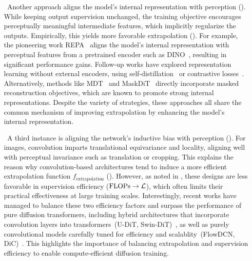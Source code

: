 {\textbf{}~Another approach aligns the model’s internal representation with perception (). While keeping output supervision unchanged, the training objective encourages perceptually meaningful intermediate features, which implicitly regularize the outputs. Empirically, this yields more favorable extrapolation (). For example, the pioneering work REPA~\citep{yu2024representation} aligns the model's internal representation with perceptual features from a pretrained encoder such as DINO~\citep{oquab2023dinov2}, resulting in significant performance gains. Follow-up works have explored representation learning without external encoders, using self-distillation~\citep{jiang2025no} or contrastive losses~\citep{wang2025diffuse}. Alternatively, methods like MDT~\citep{gao2023masked} and MaskDiT~\citep{zheng2023fast} directly incorporate masked reconstruction objectives, which are known to promote strong internal representations. Despite the variety of strategies, these approaches all share the common mechanism of improving extrapolation by enhancing the model’s internal representation.

\textbf{}~A third instance is aligning the network's inductive bias with perception (). For images, convolution imparts translational equivariance and locality, aligning well with perceptual invariance such as translation or cropping. This explains the reason why convolution-based architectures tend to induce a more efficient extrapolation function $f_{\text{extrapolation}}$ (). However, as noted in , these designs are less favorable in supervision efficiency ($\text{FLOPs} \to \mathcal{L}$), which often limits their practical effectiveness at large training scales. Interestingly, recent works have managed to balance these two efficiency factors and surpass the performance of pure diffusion transformers, including hybrid architectures that incorporate convolution layers into transformers~(U-DiT, Swin-DiT)~\citep{tian2024u,wu2025swin}, as well as purely convolutional models carefully tuned for efficiency and scalablity~(FlowDCN, DiC)~\citep{wang2024flowdcn,tian2025dic}. This highlights the importance of balancing extrapolation and supervision efficiency to enable compute-efficient diffusion training.
}